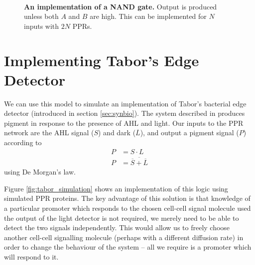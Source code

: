 \begin{figure}
\begin{center}
\begin{subfigure}{0.25\textwidth}
    \end{subfigure}
    ~
    \begin{subfigure}{0.7\textwidth}
      \centering
    \end{subfigure}
  \end{center}
  \caption{\textbf{An implementation of a NAND gate.}
    Output is produced unless both $A$ and $B$ are high.
    This can be implemented for $N$ inputs with $2N$ PPRs.
    \label{fig:nand_simulation}}
\end{figure}

\section{Implementing Tabor's Edge Detector}
\label{sec:sim_tabor}

We can use this model to simulate an implementation of Tabor's bacterial edge 
detector (introduced in section \ref{sec:synbio}).
The system described in \citet{edgeDetector} produces pigment in response to
the presence of AHL and light.
Our inputs to the PPR network are the AHL signal ($S$) and dark
($\overline{L}$), and output a pigment signal ($P$) according to 
\begin{align*}
  P &= S \cdot L \\
  P &= \overline{\overline{S} + \overline{L}}
\end{align*}
using De Morgan's law.

Figure \ref{fig:tabor_simulation} shows an implementation of this logic using
simulated PPR proteins.
The key advantage of this solution is that knowledge of a particular promoter
which responds to the chosen cell-cell signal molecule used the output of the
light detector is not required, we merely need to be able to detect the two
signals independently.
This would allow us to freely choose another cell-cell signalling molecule
(perhaps with a different diffusion rate) in order to change the behaviour of
the system -- all we require is a promoter which will respond to it.

